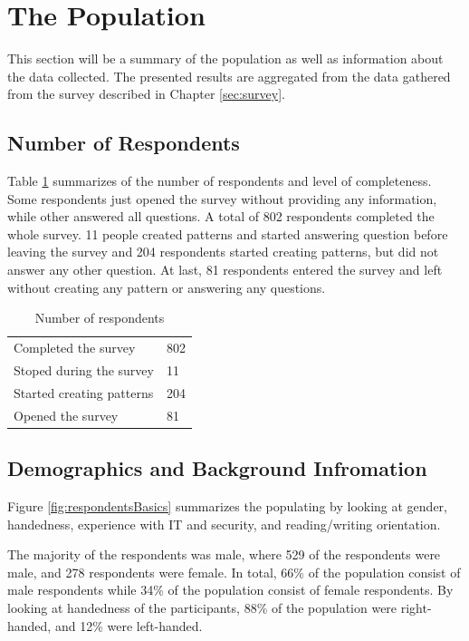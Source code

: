 \section{The Population} \label{sec:basicstatistics}
  
  This section will be a summary of the population as well as information about the data collected. The presented results are aggregated from the data gathered from the survey described in Chapter \ref{sec:survey}. 

  \subsection{Number of Respondents}

    Table \ref{fig:responsespopulation} summarizes of the number of respondents and level of completeness. Some respondents just opened the survey without providing any information, while other answered all questions. A total of 802 respondents completed the whole survey. 11 people created patterns and started answering question before leaving the survey and 204 respondents started creating patterns, but did not answer any other question. At last, 81 respondents entered the survey and left without creating any pattern or answering any questions.

    \begin{table}[H]
      \centering
      \begin{tabular}{l | l }
        \hline
        Completed the survey & 802 \\
        Stoped during the survey & 11 \\
        Started creating patterns & 204 \\
        Opened the survey & 81 \\ \hline
      \end{tabular}
      \caption{Number of respondents}
      \label{fig:responsespopulation}
    \end{table}

  \subsection{Demographics and Background Infromation}
  Figure \ref{fig:respondentsBasics} summarizes the populating by looking at gender, handedness, experience with IT and security, and reading/writing orientation.

  The majority of the respondents was male, where 529 of the respondents were male, and 278 respondents were female. In total, 66\% of the population consist of male respondents while 34\% of the population consist of female respondents. By looking at handedness of the participants, 88\% of the population were right-handed, and 12\% were left-handed. 

